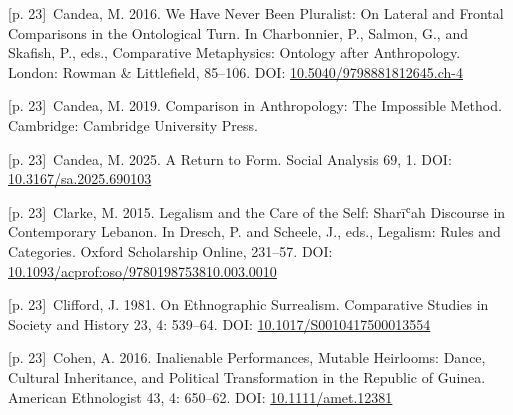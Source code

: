 \documentclass[10pt,a4paper]{article}
\begin{document}
\noindent\begin{minipage}[t]{\linewidth}{\scriptsize\color{gray} [p. 23]}\ Candea, M. 2016. We Have Never Been Pluralist: On Lateral and Frontal Comparisons in the Ontological Turn. In Charbonnier, P., Salmon, G., and Skafish, P., eds., Comparative Metaphysics: Ontology after Anthropology. London: Rowman \& Littlefield, 85–106. DOI: \url{10.5040/9798881812645.ch-4}\par\end{minipage}\par
\noindent\begin{minipage}[t]{\linewidth}{\scriptsize\color{gray} [p. 23]}\ Candea, M. 2019. Comparison in Anthropology: The Impossible Method. Cambridge: Cambridge University Press.\par\end{minipage}\par
\noindent\begin{minipage}[t]{\linewidth}{\scriptsize\color{gray} [p. 23]}\ Candea, M. 2025. A Return to Form. Social Analysis 69, 1. DOI: \url{10.3167/sa.2025.690103}\par\end{minipage}\par
\noindent\begin{minipage}[t]{\linewidth}{\scriptsize\color{gray} [p. 23]}\ Clarke, M. 2015. Legalism and the Care of the Self: Sharīʿah Discourse in Contemporary Lebanon. In Dresch, P. and Scheele, J., eds., Legalism: Rules and Categories. Oxford Scholarship Online, 231–57. DOI: \url{10.1093/acprof:oso/9780198753810.003.0010}\par\end{minipage}\par
\noindent\begin{minipage}[t]{\linewidth}{\scriptsize\color{gray} [p. 23]}\ Clifford, J. 1981. On Ethnographic Surrealism. Comparative Studies in Society and History 23, 4: 539–64. DOI: \url{10.1017/S0010417500013554}\par\end{minipage}\par
\noindent\begin{minipage}[t]{\linewidth}{\scriptsize\color{gray} [p. 23]}\ Cohen, A. 2016. Inalienable Performances, Mutable Heirlooms: Dance, Cultural Inheritance, and Political Transformation in the Republic of Guinea. American Ethnologist 43, 4: 650–62. DOI: \url{10.1111/amet.12381}\par\end{minipage}\par
\end{document}
